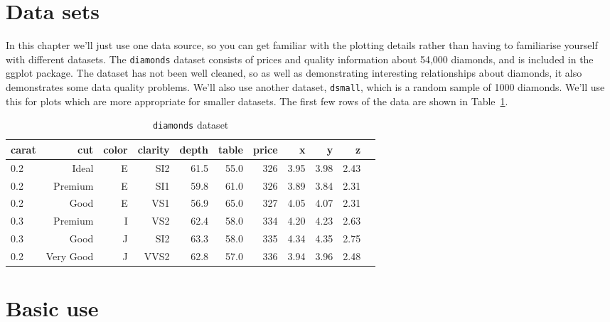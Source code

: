\section{Data sets}\label{sec:data_sets}

In this chapter we'll just use one data source, so you can get familiar with the plotting details rather than having to familiarise yourself with different datasets.  The {\tt diamonds} dataset consists of prices and quality information about 54,000 diamonds, and is included in the ggplot package.  The dataset has not been well cleaned, so as well as demonstrating interesting relationships about diamonds, it also demonstrates some data quality problems.  We'll also use another dataset, {\tt dsmall}, which is a random sample of 1000 diamonds.  We'll use this for plots which are more appropriate for smaller datasets.  The first few rows of the data are shown in Table~\ref{tab:diamonds}.

\begin{table}[ht]
\begin{center}
\begin{tabular}{lrrrrrrrrrr}
  \toprule
  carat & cut & color & clarity & depth & table & price & x & y & z \\
  \midrule
  0.2 & Ideal & E & SI2 & 61.5 & 55.0 & 326 & 3.95 & 3.98 & 2.43 \\
  0.2 & Premium & E & SI1 & 59.8 & 61.0 & 326 & 3.89 & 3.84 & 2.31 \\
  0.2 & Good & E & VS1 & 56.9 & 65.0 & 327 & 4.05 & 4.07 & 2.31 \\
  0.3 & Premium & I & VS2 & 62.4 & 58.0 & 334 & 4.20 & 4.23 & 2.63 \\
  0.3 & Good & J & SI2 & 63.3 & 58.0 & 335 & 4.34 & 4.35 & 2.75 \\
  0.2 & Very Good & J & VVS2 & 62.8 & 57.0 & 336 & 3.94 & 3.96 & 2.48 \\
  \bottomrule
\end{tabular}
\caption{{\tt diamonds} dataset}
\label{tab:diamonds}
\end{center}
\end{table}

\section{Basic use}\label{sec:basic_use}

